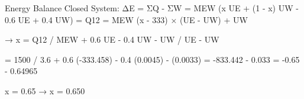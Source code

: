 Energy Balance  
Closed System: ΔE = ΣQ - ΣW  
= MEW (x UE + (1 - x) UW - 0.6 UE + 0.4 UW) = Q12  
= MEW (x - 333) × (UE - UW) + UW  

→ x = Q12 / MEW + 0.6 UE - 0.4 UW - UW / UE - UW  

= 1500 / 3.6 + 0.6 (-333.458) - 0.4 (0.0045) - (0.0033)  
= -833.442 - 0.033  
= -0.65 - 0.64965  

x = 0.65 → x = 0.650